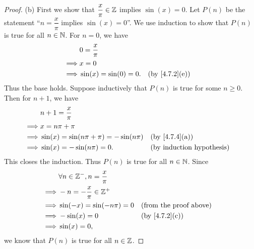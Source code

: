 \begin{proof}{(b)}
  First we show that \(\dfrac{x}{\pi} \in \mathbb{Z}\) implies \(\sin(x) = 0\).
  Let \(P(n)\) be the statement ``\(n = \dfrac{x}{\pi}\) implies \(\sin(x) = 0\)''.
  We use induction to show that \(P(n)\) is true for all \(n \in \mathbb{N}\).
  For \(n = 0\), we have
  \begin{align*}
             & 0 = \dfrac{x}{\pi}                                      \\
    \implies & x = 0                                                   \\
    \implies & \sin(x) = \sin(0) = 0. &  & \text{(by \cref{4.7.2}(e))}
  \end{align*}
  Thus the base holds.
  Suppose inductively that \(P(n)\) is true for some \(n \geq 0\).
  Then for \(n + 1\), we have
  \begin{align*}
             & n + 1 = \dfrac{x}{\pi}                                                           \\
    \implies & x = n \pi + \pi                                                                  \\
    \implies & \sin(x) = \sin(n \pi + \pi) = -\sin(n \pi) &  & \text{(by \cref{4.7.4}(a))}      \\
    \implies & \sin(x) = -\sin(n \pi) = 0.                &  & \text{(by induction hypothesis)}
  \end{align*}
  This closes the induction.
  Thus \(P(n)\) is true for all \(n \in \mathbb{N}\).
  Since
  \begin{align*}
             & \forall n \in \Z^-, n = \dfrac{x}{\pi}                                    \\
    \implies & -n = -\dfrac{x}{\pi} \in \Z^+                                             \\
    \implies & \sin(-x) = \sin(- n \pi) = 0           &  & \text{(from the proof above)} \\
    \implies & -\sin(x) = 0                           &  & \text{(by \cref{4.7.2}(c))}   \\
    \implies & \sin(x) = 0,
  \end{align*}
  we know that \(P(n)\) is true for all \(n \in \mathbb{Z}\).


\end{proof}

